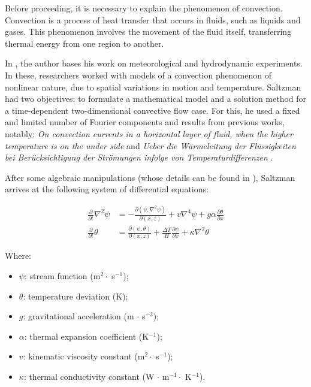 \documentclass[12pt, a4paper]{article}
\begin{document}
Before proceeding, it is necessary to explain the phenomenon of convection. Convection is a process of heat transfer that occurs in fluids, such as liquids and gases. This phenomenon involves the movement of the fluid itself, transferring thermal energy from one region to another.

In \cite{Saltzman1962}, the author bases his work on meteorological and hydrodynamic experiments. In these, researchers worked with models of a convection phenomenon of nonlinear nature, due to spatial variations in motion and temperature. Saltzman had two objectives: to formulate a mathematical model and a solution method for a time-dependent two-dimensional convective flow case. For this, he used a fixed and limited number of Fourier components and results from previous works, notably: \textit{On convection currents in a horizontal layer of fluid, when the higher temperature is on the under side} \cite{Rayleigh1916} and \textit{Ueber die Wärmeleitung der Flüssigkeiten bei Berücksichtigung der Strömungen infolge von Temperaturdifferenzen} \cite{Oberbeck1879}.

After some algebraic manipulations (whose details can be found in \cite{Saltzman1962}), Saltzman arrives at the following system of differential equations:

\begin{align}
	\frac{\partial}{\partial t} \nabla^2 \psi & = - \frac{\partial (\psi, 
	\nabla^2 \psi)}{\partial (x,z)} + v \nabla^4 \psi + g \alpha
	\frac{\partial \theta}{\partial x} \label{saltzman-1}                                \\
	\frac{\partial}{\partial t} \theta        & = \frac{\partial (\psi,   
	\theta)}{\partial (x,z)} + \frac{\Delta T}{H} \frac{\partial \psi}{\partial x}
	+ \kappa \nabla^2 \theta \label{saltzman-2}
\end{align}

Where:
\begin{itemize}
	\item $\psi$: stream function (m$^2 \cdot$ s$^{-1}$);
	\item $\theta$: temperature deviation (K);
	\item $g$: gravitational acceleration (m $\cdot$ s$^{-2}$);
	\item $\alpha$: thermal expansion coefficient (K$^{-1}$);
	\item $v$: kinematic viscosity constant (m$^2 \cdot$ s$^{-1}$);
	\item $\kappa$: thermal conductivity constant (W $\cdot$ m$^{-1} \cdot$ K$^{-1}$).
\end{itemize}
\end{document}
